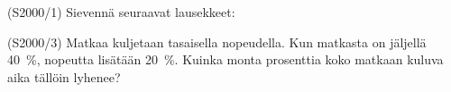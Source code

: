 \begin{tehtava}(S2000/1)   Sievennä seuraavat lausekkeet:
                        \begin{alakohdat}
                        \end{alakohdat}
\end{tehtava}

\begin{tehtava}(S2000/3)   Matkaa kuljetaan tasaisella nopeudella. Kun matkasta on
                        jäljellä 40~\%, nopeutta lisätään 20~\%. Kuinka monta
                        prosenttia koko matkaan kuluva aika tällöin lyhenee?
\end{tehtava}



